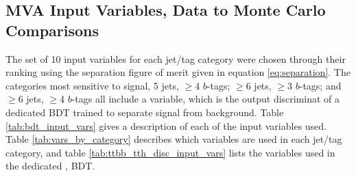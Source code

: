 \subsection{MVA Input Variables, Data to Monte Carlo Comparisons}
\label{mva_input_vars_data_to_mc_II_overview}

\par The set of 10 input variables for each jet/tag category were
chosen through their ranking using the separation figure of merit
given in equation \ref{eq:separation}.  The categories most sensitive
to signal, 5 jets, $\ge$4 $b$-tags; $\ge$6 jets, $\ge$3 $b$-tags; and
$\ge$6 jets, $\ge$4 $b$-tags all include a variable, which is the
output discriminat of a dedicated BDT trained to separate \ttH signal
from \ttbb background.  Table \ref{tab:bdt_input_vars} gives a
description of each of the input variables used.  Table
\ref{tab:vars_by_category} describes which variables are used in each
jet/tag category, and table \ref{tab:ttbb_tth_disc_input_vars} lists
the variables used in the dedicated \ttH, \ttbb BDT.  

